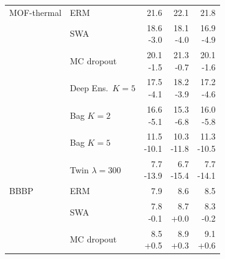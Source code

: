 {\begin{longtable}{llrrr}
    \midrule
    MOF-thermal & ERM & \makecell[r]{21.6\\\strut} & \makecell[r]{22.1\\\strut} & \makecell[r]{21.8\\\strut} \\
     & SWA & \makecell[r]{18.6\\-3.0} & \makecell[r]{18.1\\-4.0} & \makecell[r]{16.9\\-4.9} \\
     & MC dropout & \makecell[r]{20.1\\-1.5} & \makecell[r]{21.3\\-0.7} & \makecell[r]{20.1\\-1.6} \\
     & Deep Ens.\ $K{=}5$ & \makecell[r]{17.5\\-4.1} & \makecell[r]{18.2\\-3.9} & \makecell[r]{17.2\\-4.6} \\
     & Bag $K{=}2$ & \makecell[r]{16.6\\-5.1} & \makecell[r]{15.3\\-6.8} & \makecell[r]{16.0\\-5.8} \\
     & Bag $K{=}5$ & \makecell[r]{11.5\\-10.1} & \makecell[r]{10.3\\-11.8} & \makecell[r]{11.3\\-10.5} \\
     & Twin $\lambda{=}300$ & \makecell[r]{7.7\\-13.9} & \makecell[r]{6.7\\-15.4} & \makecell[r]{7.7\\-14.1} \\
    \midrule
    BBBP & ERM & \makecell[r]{7.9\\\strut} & \makecell[r]{8.6\\\strut} & \makecell[r]{8.5\\\strut} \\
     & SWA & \makecell[r]{7.8\\-0.1} & \makecell[r]{8.7\\+0.0} & \makecell[r]{8.3\\-0.2} \\
     & MC dropout & \makecell[r]{8.5\\+0.5} & \makecell[r]{8.9\\+0.3} & \makecell[r]{9.1\\+0.6} \\

\end{longtable}}
